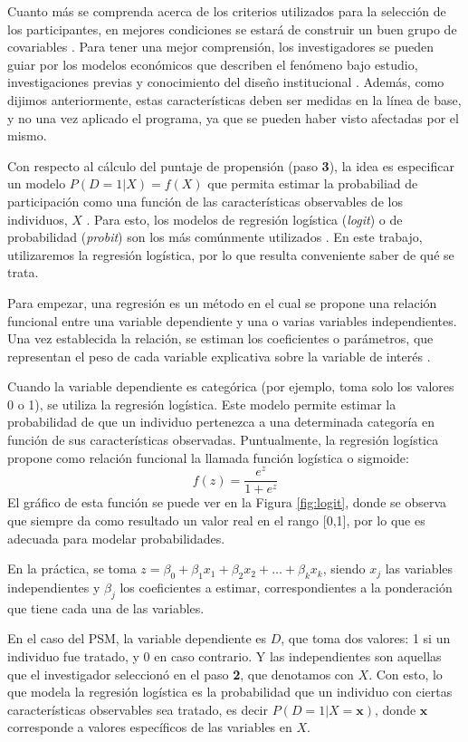 \documentclass[../../main.tex]{subfiles}
\begin{document}
Cuanto más se comprenda acerca de los criterios utilizados para la selección de los
participantes, en mejores condiciones se estará de construir un buen grupo de covariables
\cite{gertler-2016}. Para tener una mejor comprensión, los investigadores se pueden guiar
por los modelos económicos que describen el fenómeno bajo estudio, investigaciones previas
y conocimiento del diseño institucional \cite{bernal}. Además, como dijimos anteriormente,
estas características deben ser medidas en la línea de base, y no una vez aplicado el
programa, ya que se pueden haber visto afectadas por el mismo.

Con respecto al cálculo del puntaje de propensión (paso \textbf{3}), la idea es
especificar un modelo \(P(D=1|X) = f(X)\) que permita estimar la probabiliad de
participación como una función de las características observables de los individuos, \(X\)
\cite{bernal}. Para esto, los modelos de regresión logística (\textit{logit}) o de
probabilidad (\textit{probit}) son los más comúnmente utilizados \cite{bernal}. En este
trabajo, utilizaremos la regresión logística, por lo que resulta conveniente saber de qué
se trata.

Para empezar, una regresión es un método en el cual se propone una relación funcional
entre una variable dependiente y una o varias variables independientes. Una vez
establecida la relación, se estiman los coeficientes o parámetros, que representan el peso
de cada variable explicativa sobre la variable de interés \cite{giuliodori-2022}.

Cuando la variable dependiente es categórica (por ejemplo, toma solo los valores 0 o 1),
se utiliza la regresión logística. Este modelo permite estimar la probabilidad de que un
individuo pertenezca a una determinada categoría en función de sus características
observadas. Puntualmente, la regresión logística propone como relación funcional la
llamada función logística o sigmoide:
\[
    f(z) = \frac{e^z}{1 + e^z}
\]
El gráfico de esta función se puede ver en la Figura \ref{fig:logit}, donde se observa que
siempre da como resultado un valor real en el rango [0,1], por lo que es adecuada
para modelar probabilidades.

En la práctica, se toma \(z = \beta_0 + \beta_1 x_1 + \beta_2 x_2 + \dots +
\beta_k x_k\), siendo \(x_j\) las variables independientes y \(\beta_j\) los coeficientes
a estimar, correspondientes a la ponderación que tiene cada una de las variables.

En el caso del PSM, la variable dependiente es \(D\), que toma dos valores: 1 si un
individuo fue tratado, y 0 en caso contrario. Y las independientes son aquellas que el
investigador seleccionó en el paso \textbf{2}, que denotamos con \(X\). Con esto, lo que
modela la regresión logística es la probabilidad que un individuo con ciertas
características observables sea tratado, es decir \(P(D=1|X=\bm{x})\), donde \(\bm{x}\)
corresponde a valores específicos de las variables en \(X\).
\end{document}
